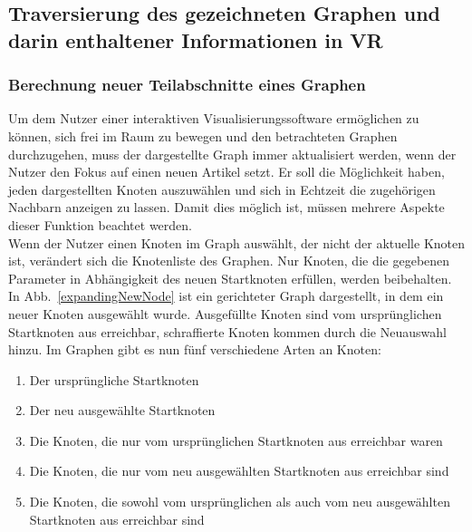 \documentclass[12pt, a4paper]{article}
\begin{document}
\newpage
\subsection{Traversierung des gezeichneten Graphen und darin enthaltener Informationen in VR}
\subsubsection{Berechnung neuer Teilabschnitte eines Graphen}
Um dem Nutzer einer interaktiven Visualisierungssoftware ermöglichen zu können, sich frei im Raum zu bewegen und den betrachteten Graphen durchzugehen, muss der dargestellte Graph immer aktualisiert werden, wenn der Nutzer den Fokus auf einen neuen Artikel setzt. Er soll die Möglichkeit haben, jeden dargestellten Knoten auszuwählen und sich in Echtzeit die zugehörigen Nachbarn anzeigen zu lassen. Damit dies möglich ist, müssen mehrere Aspekte dieser Funktion beachtet werden.\\

Wenn der Nutzer einen Knoten im Graph auswählt, der nicht der aktuelle Knoten ist, verändert sich die Knotenliste des Graphen. Nur Knoten, die die gegebenen Parameter in Abhängigkeit des neuen Startknoten erfüllen, werden beibehalten. In Abb.~\ref{expandingNewNode} ist ein gerichteter Graph dargestellt, in dem ein neuer Knoten ausgewählt wurde. Ausgefüllte Knoten sind vom ursprünglichen Startknoten aus erreichbar, schraffierte Knoten kommen durch die Neuauswahl hinzu. Im Graphen gibt es nun fünf verschiedene Arten an Knoten:
\begin{enumerate}
\item Der ursprüngliche Startknoten
\item Der neu ausgewählte Startknoten
\item Die Knoten, die nur vom ursprünglichen Startknoten aus erreichbar waren
\item Die Knoten, die nur vom neu ausgewählten Startknoten aus erreichbar sind
\item Die Knoten, die sowohl vom ursprünglichen als auch vom neu ausgewählten Startknoten aus erreichbar sind
\end{enumerate}
\end{document}
